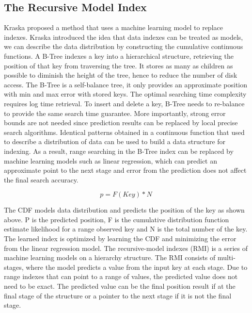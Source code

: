\subsection{The Recursive Model Index}
 Kraska \cite{Kraska:2017vh}  proposed a method that uses a machine learning model to replace indexes. Kraska introduced the idea that data indexes can be treated as models, we can describe the data distribution by constructing the cumulative continuous functions. A B-Tree indexes a key into a hierarchical structure, retrieving the position of that key from traversing the tree. It stores as many as children as possible to diminish the height of the tree, hence to reduce the number of disk access. The B-Tree is a self-balance tree, it only provides an approximate position with min and max error with stored keys. The optimal searching time complexity requires log time retrieval. To insert and delete a key, B-Tree needs to re-balance to provide the same search time guarantee. More importantly, strong error bounds are not needed since prediction results can be replaced by local precise search algorithms. Identical patterns obtained in a continuous function that used to describe a distribution of data can be used to build a data structure for indexing. As a result, range searching in the B-Tree index can be replaced by machine learning models such as linear regression, which can predict an approximate point to the next stage and error from the prediction does not affect the final search accuracy. 

\[p = F(Key) * N\]

The CDF models data distribution and predicts the position of the key as shown above. P is the predicted position, F is the cumulative distribution function estimate likelihood for a range observed key and N is the total number of the key. The learned index is optimized by learning the CDF and minimizing the error from the linear regression model. The recursive-model indexes (RMI) is a series of machine learning models on a hierarchy structure. The RMI consists of multi-stages, where the model predicts a value from the input key at each stage. Due to range indexes that can point to a range of values, the predicted value does not need to be exact. The predicted value can be the final position result if at the final stage of the structure or a pointer to the next stage if it is not the final stage. 

